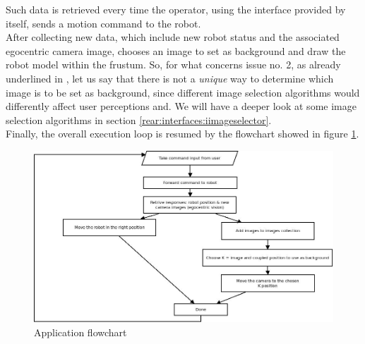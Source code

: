 Such data is retrieved every time the operator, using the 
interface provided by \framework{} itself, sends a 
motion command to the robot.
\\
After collecting new data, which include new robot status and
the associated egocentric camera image, \framework{} chooses 
an image to set as background and draw the robot model within 
the frustum. So, for what concerns issue no. 2, as already 
underlined in \cite{sugimoto}, let us say that there is not 
a \textit{unique} way to determine which image is to be set 
as background, since different image selection algorithms 
would differently affect user perceptions and. We will have a 
deeper look at some image selection algorithms in section
\ref{rear:interfaces:iimageselector}.
\\
Finally, the overall execution loop is resumed by the flowchart 
showed in figure \ref{fig:overall_diagram}.
\\
\begin{figure}[!h]
  \begin{center}
    \includegraphics[width=\textwidth]{img/overall_diagram.jpeg}  %
    \caption{Application flowchart}
    \label{fig:overall_diagram}
  \end{center}
\end{figure}

\clearpage

\clearpage

\clearpage

